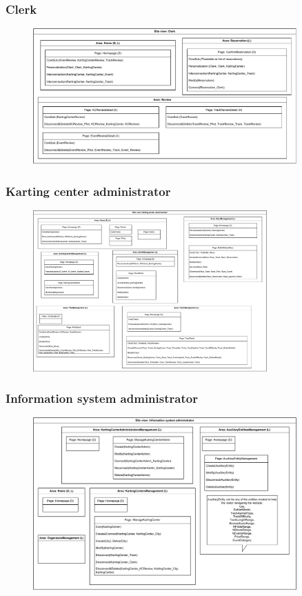 \documentclass{beamer}
\begin{document}
\begin{frame}
    \frametitle{Clerk}
    \begin{figure}
        \centering
        \includegraphics[width=0.9\textwidth]{drawio/clerk-view.pdf}
    \end{figure}
\end{frame}

\begin{frame}
    \frametitle{Karting center administrator}
    \begin{figure}
        \centering
        \includegraphics[width=0.8\textwidth]{drawio/karting-center-admin-view.pdf}
    \end{figure}
\end{frame}

\begin{frame}
    \frametitle{Information system administrator}
    \begin{figure}
        \centering
        \includegraphics[width=0.9\textwidth]{drawio/is-admin-view.pdf}
    \end{figure}
\end{frame}
\end{document}
